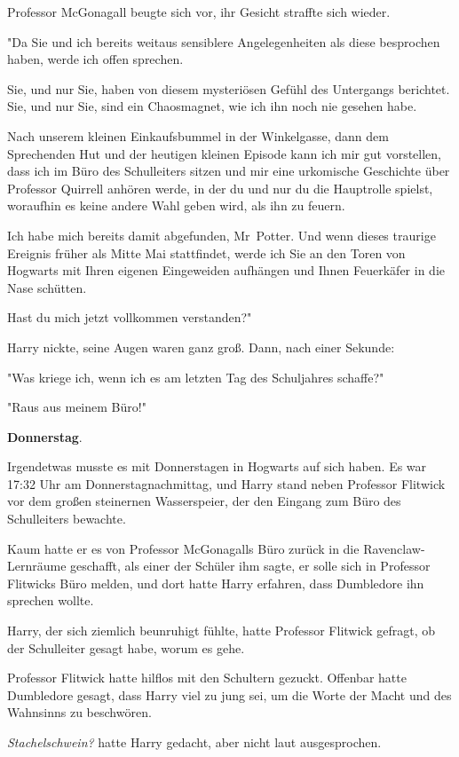 {Professor McGonagall beugte sich vor, ihr Gesicht straffte sich wieder.

"Da Sie und ich bereits weitaus sensiblere Angelegenheiten als diese besprochen haben, werde ich offen sprechen.

Sie, und nur Sie, haben von diesem mysteriösen Gefühl des Untergangs berichtet. Sie, und nur Sie, sind ein Chaosmagnet, wie ich ihn noch nie gesehen habe.

Nach unserem kleinen Einkaufsbummel in der Winkelgasse, dann dem Sprechenden Hut und der heutigen kleinen Episode kann ich mir gut vorstellen, dass ich im Büro des Schulleiters sitzen und mir eine urkomische Geschichte über Professor Quirrell anhören werde, in der du und nur du die Hauptrolle spielst, woraufhin es keine andere Wahl geben wird, als ihn zu feuern.

Ich habe mich bereits damit abgefunden, Mr~Potter. Und wenn dieses traurige Ereignis früher als Mitte Mai stattfindet, werde ich Sie an den Toren von Hogwarts mit Ihren eigenen Eingeweiden aufhängen und Ihnen Feuerkäfer in die Nase schütten.

Hast du mich jetzt vollkommen verstanden?"

Harry nickte, seine Augen waren ganz groß. Dann, nach einer Sekunde:

"Was kriege ich, wenn ich es am letzten Tag des Schuljahres schaffe?"

"Raus aus meinem Büro!"

\textbf{Donnerstag}.

Irgendetwas musste es mit Donnerstagen in Hogwarts auf sich haben. Es war 17:32 Uhr am Donnerstagnachmittag, und Harry stand neben Professor Flitwick vor dem großen steinernen Wasserspeier, der den Eingang zum Büro des Schulleiters bewachte.

Kaum hatte er es von Professor McGonagalls Büro zurück in die Ravenclaw-Lernräume geschafft, als einer der Schüler ihm sagte, er solle sich in Professor Flitwicks Büro melden, und dort hatte Harry erfahren, dass Dumbledore ihn sprechen wollte.

Harry, der sich ziemlich beunruhigt fühlte, hatte Professor Flitwick gefragt, ob der Schulleiter gesagt habe, worum es gehe.

Professor Flitwick hatte hilflos mit den Schultern gezuckt. Offenbar hatte Dumbledore gesagt, dass Harry viel zu jung sei, um die Worte der Macht und des Wahnsinns zu beschwören.

\emph{Stachelschwein?} hatte Harry gedacht, aber nicht laut ausgesprochen.

}
